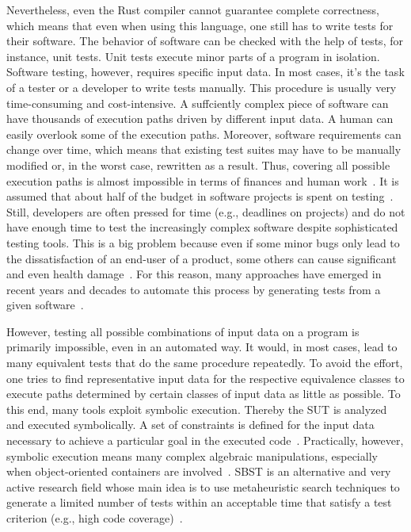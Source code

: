 \documentclass{article}
\begin{document}
Nevertheless, even the Rust compiler cannot guarantee complete correctness, which means that even when using this language, one still has to write tests for their software. The behavior of software can be checked with the help of tests, for instance, unit tests. Unit tests execute minor parts of a program in isolation. Software testing, however, requires specific input data. In most cases, it's the task of a tester or a developer to write tests manually. This procedure is usually very time-consuming and cost-intensive. A suffciently complex piece of software can have thousands of execution paths driven by different input data. A human can easily overlook some of the execution paths. Moreover, software requirements can change over time, which means that existing test suites may have to be manually modified or, in the worst case, rewritten as a result. Thus, covering all possible execution paths is almost impossible in terms of finances and human work~\cite{Myers2012}. It is assumed that about half of the budget in software projects is spent on testing~\cite{Beizer2003}. Still, developers are often pressed for time (e.g., deadlines on projects) and do not have enough time to test the increasingly complex software despite sophisticated testing tools. This is a big problem because even if some minor bugs only lead to the dissatisfaction of an end-user of a product, some others can cause significant and even health damage~\cite{Myers2012}. For this reason, many approaches have emerged in recent years and decades to automate this process by generating tests from a given software~\cite{McMinn_2004}.

However, testing all possible combinations of input data on a program is primarily impossible, even in an automated way. It would, in most cases, lead to many equivalent tests that do the same procedure repeatedly. To avoid the effort, one tries to find representative input data for the respective equivalence classes to execute paths determined by certain classes of input data as little as possible. To this end, many tools exploit symbolic execution. Thereby the \ac{SUT} is analyzed and executed symbolically. A set of constraints is defined for the input data necessary to achieve a particular goal in the executed code~\cite{Clarke1976}. Practically, however, symbolic execution means many complex algebraic manipulations, especially when object-oriented containers are involved~\cite{Korel1990}. \ac{SBST} is an alternative and very active research field whose main idea is to use metaheuristic search techniques to generate a limited number of tests within an acceptable time that satisfy a test criterion (e.g., high code coverage)~\cite{McMinn_2004}.
\end{document}
